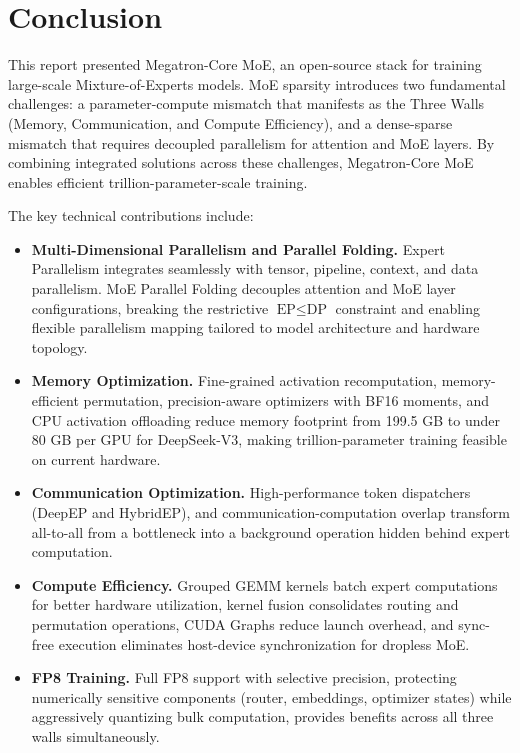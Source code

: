 \section{Conclusion}
This report presented Megatron-Core MoE, an open-source stack for training large-scale Mixture-of-Experts models. MoE sparsity introduces two fundamental challenges: a parameter-compute mismatch that manifests as the Three Walls (Memory, Communication, and Compute Efficiency), and a dense-sparse mismatch that requires decoupled parallelism for attention and MoE layers. By combining integrated solutions across these challenges, Megatron-Core MoE enables efficient trillion-parameter-scale training.

The key technical contributions include:
\begin{itemize}
    \item \textbf{Multi-Dimensional Parallelism and Parallel Folding.} Expert Parallelism integrates seamlessly with tensor, pipeline, context, and data parallelism. MoE Parallel Folding decouples attention and MoE layer configurations, breaking the restrictive $\text{EP} \leq \text{DP}$ constraint and enabling flexible parallelism mapping tailored to model architecture and hardware topology.

    \item \textbf{Memory Optimization.} Fine-grained activation recomputation, memory-efficient permutation, precision-aware optimizers with BF16 moments, and CPU activation offloading reduce memory footprint from 199.5 GB to under 80 GB per GPU for DeepSeek-V3, making trillion-parameter training feasible on current hardware.

    \item \textbf{Communication Optimization.} High-performance token dispatchers (DeepEP and HybridEP), and communication-computation overlap transform all-to-all from a bottleneck into a background operation hidden behind expert computation.

    \item \textbf{Compute Efficiency.} Grouped GEMM kernels batch expert computations for better hardware utilization, kernel fusion consolidates routing and permutation operations, CUDA Graphs reduce launch overhead, and sync-free execution eliminates host-device synchronization for dropless MoE.

    \item \textbf{FP8 Training.} Full FP8 support with selective precision, protecting numerically sensitive components (router, embeddings, optimizer states) while aggressively quantizing bulk computation, provides benefits across all three walls simultaneously.


\end{itemize}
